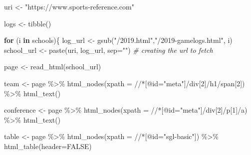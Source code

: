 \documentclass[
]{book}
\newenvironment{Shaded}{\begin{snugshade}}{\end{snugshade}}
\newcommand{\AttributeTok}[1]{\textcolor[rgb]{0.77,0.63,0.00}{#1}}
\newcommand{\CommentTok}[1]{\textcolor[rgb]{0.56,0.35,0.01}{\textit{#1}}}
\newcommand{\ConstantTok}[1]{\textcolor[rgb]{0.00,0.00,0.00}{#1}}
\newcommand{\ControlFlowTok}[1]{\textcolor[rgb]{0.13,0.29,0.53}{\textbf{#1}}}
\newcommand{\FunctionTok}[1]{\textcolor[rgb]{0.00,0.00,0.00}{#1}}
\newcommand{\NormalTok}[1]{#1}
\newcommand{\OtherTok}[1]{\textcolor[rgb]{0.56,0.35,0.01}{#1}}
\newcommand{\SpecialCharTok}[1]{\textcolor[rgb]{0.00,0.00,0.00}{#1}}
\newcommand{\StringTok}[1]{\textcolor[rgb]{0.31,0.60,0.02}{#1}}
\begin{document}
\begin{Shaded}
\begin{Highlighting}[]
\NormalTok{uri }\OtherTok{\textless{}{-}} \StringTok{"https://www.sports{-}reference.com"}

\NormalTok{logs }\OtherTok{\textless{}{-}} \FunctionTok{tibble}\NormalTok{()}

\ControlFlowTok{for}\NormalTok{ (i }\ControlFlowTok{in}\NormalTok{ schools)\{}
\NormalTok{  log\_url }\OtherTok{\textless{}{-}} \FunctionTok{gsub}\NormalTok{(}\StringTok{"/2019.html"}\NormalTok{,}\StringTok{"/2019{-}gamelogs.html"}\NormalTok{, i)}
\NormalTok{  school\_url }\OtherTok{\textless{}{-}} \FunctionTok{paste}\NormalTok{(uri, log\_url, }\AttributeTok{sep=}\StringTok{""}\NormalTok{)  }\CommentTok{\# creating the url to fetch}
  
\NormalTok{  page }\OtherTok{\textless{}{-}} \FunctionTok{read\_html}\NormalTok{(school\_url)}
  
\NormalTok{  team }\OtherTok{\textless{}{-}}\NormalTok{ page }\SpecialCharTok{\%\textgreater{}\%}
    \FunctionTok{html\_nodes}\NormalTok{(}\AttributeTok{xpath =} \StringTok{\textquotesingle{}//*[@id="meta"]/div[2]/h1/span[2]\textquotesingle{}}\NormalTok{) }\SpecialCharTok{\%\textgreater{}\%}
    \FunctionTok{html\_text}\NormalTok{()}
  
\NormalTok{  conference }\OtherTok{\textless{}{-}}\NormalTok{ page }\SpecialCharTok{\%\textgreater{}\%}
    \FunctionTok{html\_nodes}\NormalTok{(}\AttributeTok{xpath =} \StringTok{\textquotesingle{}//*[@id="meta"]/div[2]/p[1]/a\textquotesingle{}}\NormalTok{) }\SpecialCharTok{\%\textgreater{}\%}
    \FunctionTok{html\_text}\NormalTok{()}

\NormalTok{  table }\OtherTok{\textless{}{-}}\NormalTok{ page }\SpecialCharTok{\%\textgreater{}\%}
    \FunctionTok{html\_nodes}\NormalTok{(}\AttributeTok{xpath =} \StringTok{\textquotesingle{}//*[@id="sgl{-}basic"]\textquotesingle{}}\NormalTok{) }\SpecialCharTok{\%\textgreater{}\%}
    \FunctionTok{html\_table}\NormalTok{(}\AttributeTok{header=}\ConstantTok{FALSE}\NormalTok{)}


\end{Highlighting}
\end{Shaded}
\end{document}
